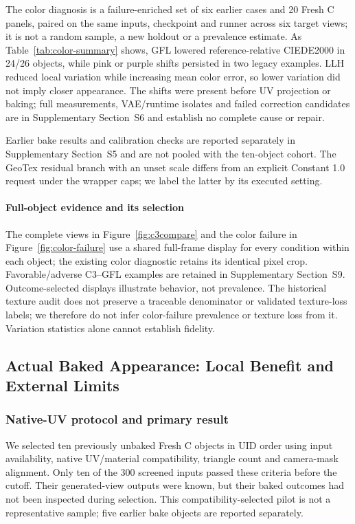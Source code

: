 \documentclass[times,twocolumn,final]{elsarticle}
\begin{document}
The color diagnosis is a failure-enriched set of six earlier cases and 20 Fresh C panels, paired on the same inputs, checkpoint and runner across six target views; it is not a random sample, a new holdout or a prevalence estimate. As Table~\ref{tab:color-summary} shows, GFL lowered reference-relative CIEDE2000 in 24/26 objects, while pink or purple shifts persisted in two legacy examples. LLH reduced local variation while increasing mean color error, so lower variation did not imply closer appearance. The shifts were present before UV projection or baking; full measurements, VAE/runtime isolates and failed correction candidates are in Supplementary Section~S6 and establish no complete cause or repair.

Earlier bake results and calibration checks are reported separately in Supplementary Section~S5 and are not pooled with the ten-object cohort. The GeoTex residual branch with an unset scale differs from an explicit Constant 1.0 request under the wrapper caps; we label the latter by its executed setting.

\paragraph{Full-object evidence and its selection}
The complete views in Figure~\ref{fig:c3compare} and the color failure in Figure~\ref{fig:color-failure} use a shared full-frame display for every condition within each object; the existing color diagnostic retains its identical pixel crop. Favorable/adverse C3--GFL examples are retained in Supplementary Section~S9. Outcome-selected displays illustrate behavior, not prevalence. The historical texture audit does not preserve a traceable denominator or validated texture-loss labels; we therefore do not infer color-failure prevalence or texture loss from it. Variation statistics alone cannot establish fidelity.


\subsection{Actual Baked Appearance: Local Benefit and External Limits}
\label{subsec:new-bake}
\subsubsection{Native-UV protocol and primary result}
We selected ten previously unbaked Fresh C objects in UID order using input availability, native UV/material compatibility, triangle count and camera-mask alignment. Only ten of the 300 screened inputs passed these criteria before the cutoff. Their generated-view outputs were known, but their baked outcomes had not been inspected during selection. This compatibility-selected pilot is not a representative sample; five earlier bake objects are reported separately.
\end{document}
